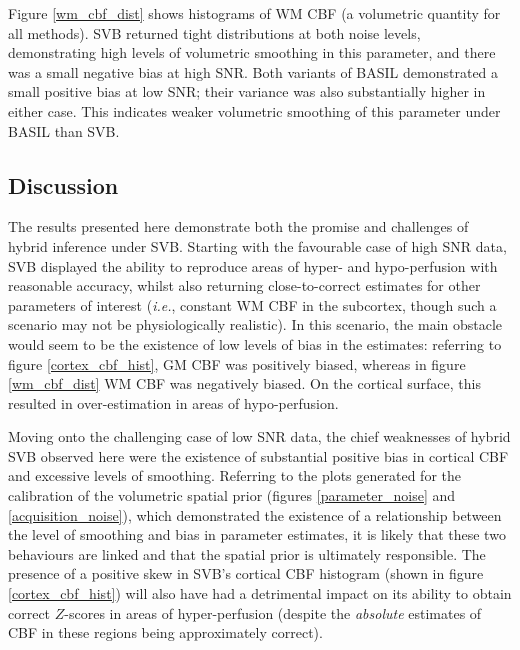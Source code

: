 \documentclass[12pt]{report}
\begin{document}
Figure \ref{wm_cbf_dist} shows histograms of WM CBF (a volumetric quantity for all methods). SVB returned tight distributions at both noise levels, demonstrating high levels of volumetric smoothing in this parameter, and there was a small negative bias at high SNR. Both variants of BASIL demonstrated a small positive bias at low SNR; their variance was also substantially higher in either case. This indicates weaker volumetric smoothing of this parameter under BASIL than SVB. 

\subsection{Discussion}

The results presented here demonstrate both the promise and challenges of hybrid inference under SVB. Starting with the favourable case of high SNR data, SVB displayed the ability to reproduce areas of hyper- and hypo-perfusion with reasonable accuracy, whilst also returning close-to-correct estimates for other parameters of interest (\textit{i.e.}, constant WM CBF in the subcortex, though such a scenario may not be physiologically realistic). In this scenario, the main obstacle would seem to be the existence of low levels of bias in the estimates: referring to figure \ref{cortex_cbf_hist}, GM CBF was positively biased, whereas in figure \ref{wm_cbf_dist} WM CBF was negatively biased. On the cortical surface, this resulted in over-estimation in areas of hypo-perfusion. 

Moving onto the challenging case of low SNR data, the chief weaknesses of hybrid SVB observed here were the existence of substantial positive bias in cortical CBF and excessive levels of smoothing. Referring to the plots generated for the calibration of the volumetric spatial prior (figures \ref{parameter_noise} and \ref{acquisition_noise}), which demonstrated the existence of a relationship between the level of smoothing and bias in parameter estimates, it is likely that these two behaviours are linked and that the spatial prior is ultimately responsible. The presence of a positive skew in SVB's cortical CBF histogram (shown in figure \ref{cortex_cbf_hist}) will also have had a detrimental impact on its ability to obtain correct $Z$-scores in areas of hyper-perfusion (despite the \textit{absolute} estimates of CBF in these regions being approximately correct). 
\end{document}
